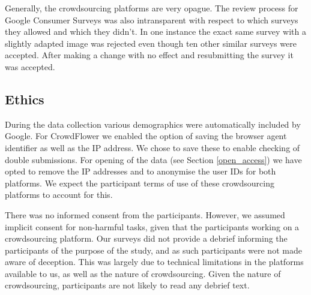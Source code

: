 \documentclass[twoside,letterpaper]{soups}
\begin{document}
Generally, the crowdsourcing platforms are very opague. The review process for Google Consumer Surveys was also intransparent with respect to which surveys they allowed and which they didn't. In one instance the exact same survey with a slightly adapted image was rejected even though ten other similar surveys were accepted. After making a change with no effect and resubmitting the survey it was accepted.









\subsection{Ethics}

During the data collection various demographics were automatically included by Google. For CrowdFlower we enabled the option of saving the browser agent identifier as well as the IP address. We chose to save these to enable checking of double submissions. For opening of the data (see Section \ref{open_access}) we have opted to remove the IP addresses and to anonymise the user IDs for both platforms. We expect the participant terms of use of these crowdsourcing platforms to account for this.

There was no informed consent from the participants. However, we assumed implicit consent for non-harmful tasks, given that the participants working on a crowdsourcing platform. Our surveys did not provide a debrief informing the participants of the purpose of the study, and as such participants were not made aware of deception. This was largely due to technical limitations in the platforms available to us, as well as the nature of crowdsourcing. Given the nature of crowdsourcing, participants are not likely to read any debrief text.
\end{document}
